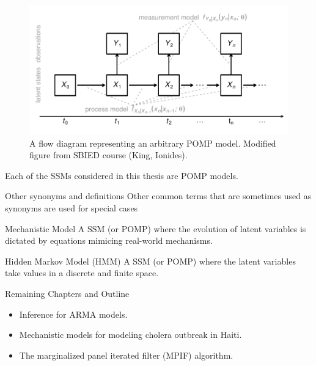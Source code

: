 \documentclass[aspectratio=169]{beamer}\usepackage[]{graphicx}\usepackage[]{xcolor}
\makeatletter
\def\maxwidth{ %
  \ifdim\Gin@nat@width>\linewidth
    \linewidth
  \else
    \Gin@nat@width
  \fi
}
\newenvironment{knitrout}{}{} %
\makeatother
\begin{document}
\begin{frame}
\begin{figure}[!ht]
\begin{knitrout}
\color{fgcolor}
\includegraphics[width=0.75\maxwidth]{figure/pompDiagram-1} 
\end{knitrout}
\caption{\label{fig:pompDiagram}A flow diagram representing an arbitrary POMP model. Modified figure from SBIED course (King, Ionides).}
\end{figure}

\alert{Each of the SSMs considered in this thesis are POMP models.}

\end{frame}

\begin{frame}{Other synonyms and definitions}
  Other common terms that are sometimes used as synonyms are used for special cases 
  \begin{block}{Mechanistic Model}
    A SSM (or POMP) where the evolution of latent variables is dictated by equations mimicing real-world mechanisms. 
  \end{block}
  
  \begin{block}{Hidden Markov Model (HMM)}
    A SSM (or POMP) where the latent variables take values in a discrete and finite space.
  \end{block}
  
\end{frame}

\begin{frame}{Remaining Chapters and Outline}
  \begin{itemize}
    \item Inference for ARMA models.
    \item Mechanistic models for modeling cholera outbreak in Haiti.
    \item The marginalized panel iterated filter (MPIF) algorithm.
  \end{itemize}
\end{frame}
\end{document}
